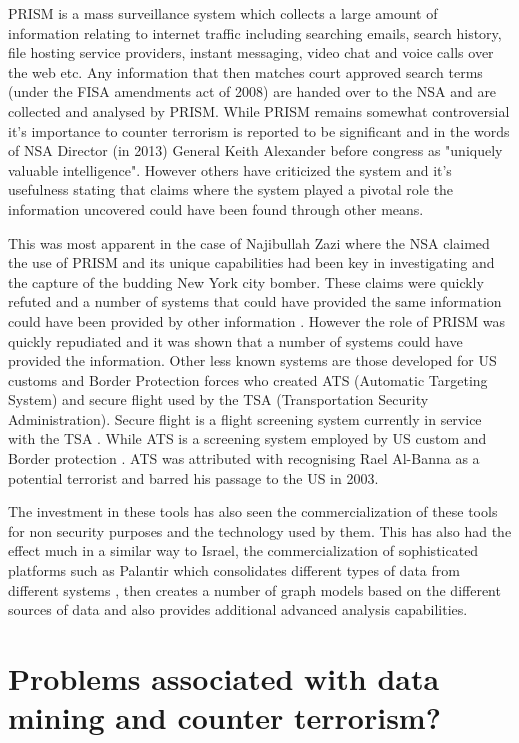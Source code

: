 PRISM is a mass surveillance system which collects a large amount of information relating to internet traffic including searching emails, search history, file hosting service providers, instant messaging, video chat and voice calls over the web etc. Any information that then matches court approved search terms (under the FISA amendments act of 2008) are handed over to the NSA and are collected and analysed by PRISM. While PRISM remains somewhat controversial it's importance to counter terrorism is reported to be significant and in the words of NSA Director (in 2013) General Keith Alexander before congress  as "uniquely valuable intelligence". However others have criticized the system and it's usefulness stating that claims where the system played a pivotal role the information uncovered could have been found through other means. 

This was most apparent in the case of Najibullah Zazi where the NSA claimed the use of PRISM and its unique capabilities had been key in investigating and the capture of the budding New York city bomber. These claims were quickly refuted and  a number of systems that could have provided the same information could  have been provided by other information \citep{NSAAtlanticWire2013}. However the role of PRISM was quickly repudiated  and it was shown that a number of systems could have provided the information. Other less known systems are those developed for US customs and Border Protection forces who created ATS (Automatic Targeting System) and secure flight used by the TSA (Transportation Security Administration). Secure flight is a flight screening system currently in service with the TSA \citep{spear2015secure}. While ATS is a screening system employed by US custom and Border protection \citep{jizba2015analysis}. ATS was attributed with recognising Rael Al-Banna as a potential terrorist and barred his passage to the US in 2003.

The investment in these tools has also seen the commercialization of these tools for non security purposes and the technology used by them. This has also had the effect much in a similar way to Israel, the commercialization of sophisticated platforms such as Palantir which consolidates different types of data from different systems \citep{soklakova2016technological}, then creates a number of graph models based on the different sources of data and also provides additional advanced analysis capabilities.

\section{Problems associated with data mining and counter terrorism?}

